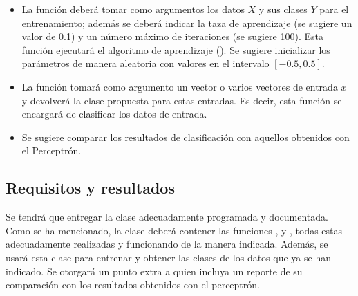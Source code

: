 \begin{itemize}
    \item La función  deberá tomar como argumentos los datos $X$ y sus clases $Y$ para el entrenamiento; además se deberá indicar la taza de aprendizaje (se sugiere un valor de 0.1) y un número máximo de iteraciones (se sugiere 100). Esta función ejecutará el algoritmo de aprendizaje (). Se sugiere inicializar los parámetros de manera aleatoria con valores en el intervalo $[-0.5,0.5]$.

    \item La función  tomará como argumento un vector o varios vectores de entrada $x$ y devolverá la clase propuesta para estas entradas. Es decir, esta función se encargará de clasificar los datos de entrada.

    \item Se sugiere comparar los resultados de clasificación con aquellos obtenidos con el Perceptrón. 
\end{itemize}


\subsection{Requisitos y resultados}

Se tendrá que entregar la clase  adecuadamente programada y documentada. Como se ha mencionado, la clase deberá contener las funciones ,  y , todas estas adecuadamente realizadas y funcionando de la manera indicada. Además, se usará esta clase para entrenar y obtener las clases de los datos que ya se han indicado.  Se otorgará un punto extra a quien incluya un reporte de su comparación con los resultados obtenidos con el perceptrón.
